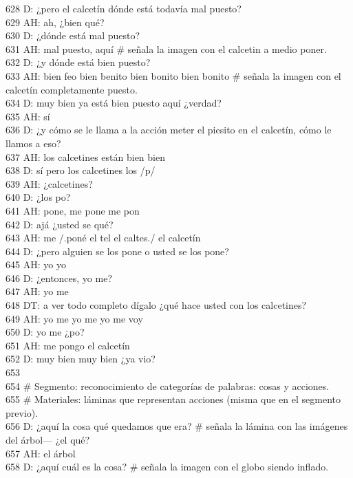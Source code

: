 628 D: ¿pero el calcetín dónde está todavía mal puesto?\\
629 AH: ah, ¿bien qué?\\
630 D: ¿dónde está mal puesto?\\
631 AH: mal puesto, aquí \# señala la imagen con el calcetin a medio poner.\\
632 D: ¿y dónde está bien puesto?\\
633 AH: bien feo bien benito bien bonito bien bonito \# señala la imagen con el calcetín completamente puesto.\\
634 D: muy bien ya está bien puesto aquí ¿verdad?\\
635 AH: sí\\
636 D: ¿y cómo se le llama a la acción meter el piesito en el calcetín, cómo le llamos a eso?\\
637 AH: los calcetines están bien bien\\
638 D: sí pero los calcetines los /p/\\
639 AH: ¿calcetines?\\
640 D: ¿los po?\\
641 AH: pone, me pone me pon\\
642 D: ajá ¿usted se qué?\\
643 AH: me /.poné el tel el caltes./ el calcetín\\
644 D: ¿pero alguien se los pone o usted se los pone?\\
645 AH: yo yo\\
646 D: ¿entonces, yo me?\\
647 AH: yo me\\
648 DT: a ver todo completo dígalo ¿qué hace usted con los calcetines?\\
649 AH: yo me yo me yo me voy\\
650 D: yo me ¿po?\\
651 AH: me pongo el calcetín\\
652 D: muy bien muy bien ¿ya vio?\\
653 \\
654 \# Segmento: reconocimiento de categorías de palabras: cosas y acciones.\\
655 \# Materiales: láminas que representan acciones (misma que en el segmento previo).\\
656 D: ¿aquí la cosa qué quedamos que era? \# señala la lámina con las imágenes del árbol--- ¿el qué?\\
657 AH: el árbol\\
658 D: ¿aquí cuál es la cosa? \# señala la imagen con el globo siendo inflado.\\
